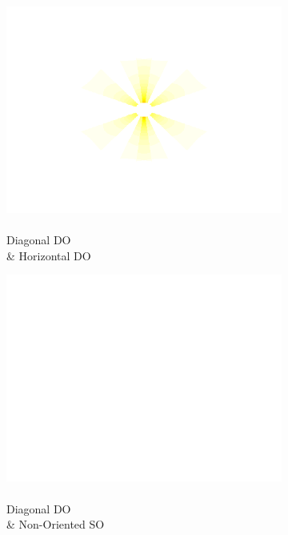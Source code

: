 \documentclass[journal,onecolumn]{IEEEtran}
\begin{document}
\begin{figure}[h]
\begin{subfigure}[b]{0.2\textwidth}
            \includegraphics[width=.85\linewidth]{w_2_3}
            \caption{\\ Diagonal DO \\ \& Horizontal DO}
    \end{subfigure}%
    \begin{subfigure}[b]{0.2\textwidth}
            \centering
            \captionsetup{justification=centering}
            \includegraphics[width=.85\linewidth]{w_blank}
            \caption{\\ Diagonal DO \\ \& Non-Oriented SO}
    \end{subfigure}%
    \par \bigskip
    \begin{subfigure}[b]{0.2\textwidth}
            \centering
            \captionsetup{justification=centering}

\end{subfigure}
\end{figure}
\end{document}
